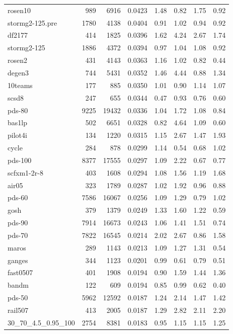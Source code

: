 \documentclass[10pt]{article}
\begin{document}
\begin{longtable}{|l|r|r|r|r|r|r|r|}
rosen10	&	989	&	6916	&	0.0423	&	1.48	&	0.82	&	1.75	&	0.92	\\
stormg2-125.pre	&	1780	&	4138	&	0.0404	&	0.91	&	1.02	&	0.94	&	0.92	\\
df2177	&	414	&	1825	&	0.0396	&	1.62	&	4.24	&	2.67	&	1.74	\\
stormg2-125	&	1886	&	4372	&	0.0394	&	0.97	&	1.04	&	1.08	&	0.92	\\
rosen2	&	431	&	4143	&	0.0363	&	1.16	&	1.02	&	0.82	&	0.44	\\
degen3	&	744	&	5431	&	0.0352	&	1.46	&	4.44	&	0.88	&	1.34	\\
10teams	&	177	&	885	&	0.0350	&	1.01	&	0.90	&	1.14	&	1.07	\\
scsd8	&	247	&	655	&	0.0344	&	0.47	&	0.93	&	0.76	&	0.60	\\
pds-80	&	9225	&	19432	&	0.0336	&	1.04	&	1.72	&	1.08	&	0.84	\\
bas1lp	&	502	&	6651	&	0.0328	&	0.82	&	4.64	&	1.09	&	0.60	\\
pilot4i	&	134	&	1220	&	0.0315	&	1.15	&	2.67	&	1.47	&	1.93	\\
cycle	&	284	&	878	&	0.0299	&	1.14	&	0.54	&	0.68	&	1.02	\\
pds-100	&	8377	&	17555	&	0.0297	&	1.09	&	2.22	&	0.67	&	0.77	\\
scfxm1-2r-8	&	403	&	1608	&	0.0294	&	1.08	&	1.56	&	1.19	&	1.68	\\
air05	&	323	&	1789	&	0.0287	&	1.02	&	1.92	&	0.96	&	0.88	\\
pds-60	&	7586	&	16067	&	0.0256	&	1.09	&	1.29	&	0.79	&	1.02	\\
gosh	&	379	&	1379	&	0.0249	&	1.33	&	1.60	&	1.22	&	0.59	\\
pds-90	&	7914	&	16673	&	0.0243	&	1.06	&	1.41	&	1.51	&	0.74	\\
pds-70	&	7822	&	16545	&	0.0214	&	2.02	&	2.67	&	0.86	&	1.58	\\
maros	&	289	&	1143	&	0.0213	&	1.09	&	1.27	&	1.31	&	0.54	\\
ganges	&	344	&	1123	&	0.0201	&	0.99	&	0.61	&	0.79	&	0.51	\\
fast0507	&	401	&	1908	&	0.0194	&	0.90	&	1.59	&	1.44	&	1.36	\\
bandm	&	122	&	609	&	0.0194	&	0.85	&	0.99	&	0.62	&	0.40	\\
pds-50	&	5962	&	12592	&	0.0187	&	1.24	&	2.14	&	1.47	&	1.42	\\
rail507	&	413	&	2005	&	0.0187	&	1.29	&	2.82	&	2.11	&	2.20	\\
30\_70\_4.5\_0.95\_100	&	2754	&	8381	&	0.0183	&	0.95	&	1.15	&	1.15	&	1.25	\\

\end{longtable}
\end{document}
